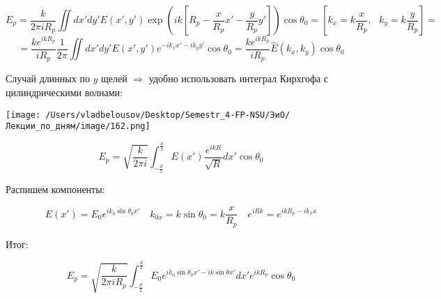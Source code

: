 \documentclass[12pt, a4paper]{report}
\begin{document}
\[ E_p = \frac{k}{2 \pi i R_p } \iint dx ' d y ' E(x' , y')   \exp \left( ik \left[ R_p - \frac{x}{R_p }x ' - \frac{y}{R_p }y '   \right]  \right) \cos \theta_0  = \left[ k_x = k \frac{x}{R_p }, \text{ }  k_y = k \frac{y }{R_p }   \right] = \]  
\[ = \frac{k e^{ ik R_p} }{i R_p } \frac{1}{2 \pi } \iint dx ' d y ' E(x' , y' )e^{ - i k_x x '- i k_y y ' } \cos \theta_0 = \frac{k e^{ ik R_p } }{i R_p } \hat{E } (k_x , k_y ) \cos \theta_0       \] 

Случай длинных по \( y \)  щелей \( \Rightarrow  \) удобно использовать интеграл Кирхгофа с цилиндрическими волнами: 

\begin{center}
    \texttt{[image: /Users/vladbelousov/Desktop/Semestr\_4-FP-NSU/ЭиО/Лекции\_по\_дням/image/162.png]}
\end{center}

\[ E_p = \sqrt{\frac{k}{ 2 \pi i } } \int_{-\frac{d}{2 } }^{\frac{d}{2} } E(x' ) \frac{e^{i k R} }{\sqrt{R}} dx ' \cos \theta_0   \] 

Распишем компоненты: 

\[ E(x' ) = E_0 e^{i k_0 \sin \theta_0 x '} \quad  k_{0x} = k \sin \theta_0= k \frac{x}{R_p} \quad  e^{i R k} = e^{ ik R_p - i k_x x }     \]  

Итог: 

\[ E_p = \sqrt{\frac{k}{2 \pi i R_p }  } \int_{-\frac{d}{2 } }^{\frac{d}{2} } E_0 e^{ i k_0  \sin  \theta_0 x ' - i k \sin  \theta x' }d x ' e^{ ik R_p }    \cos \theta_0    \] 


\ifdefined\mainfile
\else
    
\end{document}
